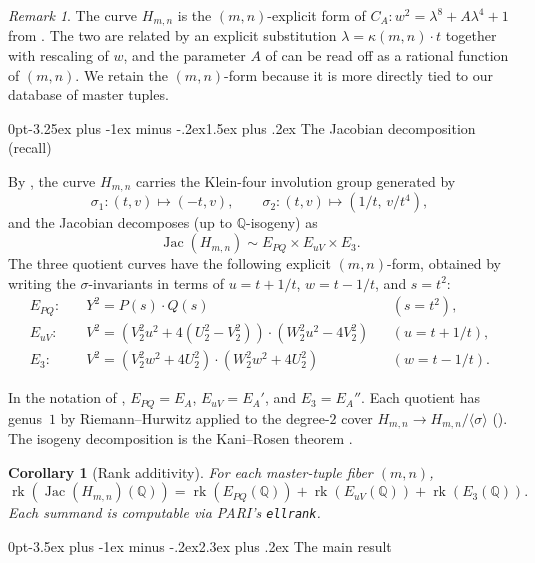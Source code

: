 \documentclass[12pt,a4paper,reqno]{amsart}
\makeatletter
\renewcommand{\section}{\@startsection{section}{1}%
  {0pt}{-3.5ex plus -1ex minus -.2ex}{2.3ex plus .2ex}%
  {\normalfont\large\bfseries}}
\renewcommand{\subsection}{\@startsection{subsection}{2}%
  {0pt}{-3.25ex plus -1ex minus -.2ex}{1.5ex plus .2ex}%
  {\normalfont\normalsize\bfseries}}
\theoremstyle{plain}
\newtheorem{corollary}[theorem]{Corollary}
\theoremstyle{definition}
\theoremstyle{remark}
\newtheorem{remark}[theorem]{Remark}
\newcommand{\Q}{\mathbb{Q}}
\newcommand{\HC}{H_{m,n}}
\newcommand{\Jac}{\operatorname{Jac}}
\newcommand{\rk}{\operatorname{rk}}
\makeatother
\begin{document}
\begin{remark}
The curve $\HC$ is the $(m, n)$-explicit form of $C_A: w^2 = \lambda^8 + A \lambda^4 + 1$ from \cite[Lemma 3.1]{peschmann-paper1}. The two are related by an explicit substitution $\lambda = \kappa(m, n) \cdot t$ together with rescaling of $w$, and the parameter $A$ of \cite{peschmann-paper1} can be read off as a rational function of $(m, n)$. We retain the $(m, n)$-form because it is more directly tied to our database of master tuples.
\end{remark}

\subsection{The Jacobian decomposition (recall)}

By \cite[Proposition 4.1]{peschmann-paper1}, the curve $\HC$ carries the Klein-four involution group generated by
$$
\sigma_1: (t, v) \mapsto (-t, v), \qquad
\sigma_2: (t, v) \mapsto (1/t, \, v/t^4),
$$
and the Jacobian decomposes (up to $\Q$-isogeny) as
$$
\Jac(\HC) \sim E_{PQ} \times E_{uV} \times E_3.
$$
The three quotient curves have the following explicit $(m, n)$-form, obtained by writing the $\sigma$-invariants in terms of $u = t + 1/t$, $w = t - 1/t$, and $s = t^2$:
\begin{align*}
E_{PQ}: \quad & Y^2 = P(s) \cdot Q(s) && (s = t^2), \\
E_{uV}: \quad & V^2 = (V_2^2 u^2 + 4(U_2^2 - V_2^2)) \cdot (W_2^2 u^2 - 4 V_2^2) && (u = t + 1/t), \\
E_3:    \quad & V^2 = (V_2^2 w^2 + 4 U_2^2) \cdot (W_2^2 w^2 + 4 U_2^2) && (w = t - 1/t).
\end{align*}

In the notation of \cite[\S 4.1]{peschmann-paper1}, $E_{PQ} = E_A$, $E_{uV} = E_A'$, and $E_3 = E_A''$. Each quotient has genus~$1$ by Riemann--Hurwitz applied to the degree-$2$ cover $\HC \to \HC / \langle \sigma \rangle$ (\cite[\S 4]{peschmann-paper1}). The isogeny decomposition is the Kani--Rosen theorem \cite{kani-rosen}.

\begin{corollary}[Rank additivity]
\label{cor:rank-additivity}
For each master-tuple fiber $(m, n)$,
$$
\rk(\Jac(\HC)(\Q)) = \rk(E_{PQ}(\Q)) + \rk(E_{uV}(\Q)) + \rk(E_3(\Q)).
$$
Each summand is computable via PARI's \texttt{ellrank}.
\end{corollary}

\section{The main result}
\label{sec:main}
\end{document}
